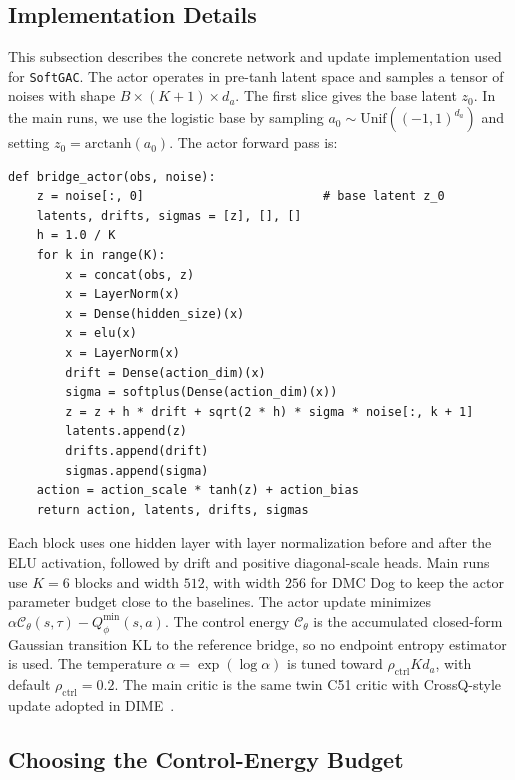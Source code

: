 \documentclass[11pt]{article}
\newcommand{\myalgo}{\texttt{SoftGAC}\xspace}
\begin{document}
\subsection{Implementation Details}
\label{app:implementation_details}

This subsection describes the concrete network and update implementation used for \myalgo. The actor operates in pre-tanh latent space and samples a tensor of noises with shape $B\times(K+1)\times d_a$. The first slice gives the base latent $z_0$. In the main runs, we use the logistic base by sampling $a_0\sim\mathrm{Unif}((-1,1)^{d_a})$ and setting $z_0=\mathrm{arctanh}(a_0)$. The actor forward pass is:

\begin{verbatim}
def bridge_actor(obs, noise):
    z = noise[:, 0]                         # base latent z_0
    latents, drifts, sigmas = [z], [], []
    h = 1.0 / K
    for k in range(K):
        x = concat(obs, z)
        x = LayerNorm(x)
        x = Dense(hidden_size)(x)
        x = elu(x)
        x = LayerNorm(x)
        drift = Dense(action_dim)(x)
        sigma = softplus(Dense(action_dim)(x))
        z = z + h * drift + sqrt(2 * h) * sigma * noise[:, k + 1]
        latents.append(z)
        drifts.append(drift)
        sigmas.append(sigma)
    action = action_scale * tanh(z) + action_bias
    return action, latents, drifts, sigmas
\end{verbatim}

Each block uses one hidden layer with layer normalization before and after the ELU activation, followed by drift and positive diagonal-scale heads. Main runs use $K=6$ blocks and width $512$, with width $256$ for DMC Dog to keep the actor parameter budget close to the baselines. The actor update minimizes $\alpha\mathcal C_\theta(s,\tau)-Q_\phi^{\min}(s,a)$. The control energy $\mathcal C_\theta$ is the accumulated closed-form Gaussian transition KL to the reference bridge, so no endpoint entropy estimator is used. The temperature $\alpha=\exp(\log\alpha)$ is tuned toward $\rho_{\mathrm{ctrl}}Kd_a$, with default $\rho_{\mathrm{ctrl}}=0.2$. The main critic is the same twin C51 critic with CrossQ-style update adopted in DIME~\citep{DIME25}.

\subsection{Choosing the Control-Energy Budget}
\label{app:rho_ctrl_choice}
\end{document}
